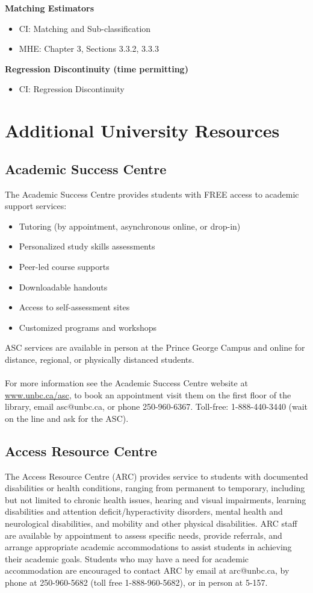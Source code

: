 \documentclass[letterpaper,12pt]{article}
\theoremstyle{dotlessS}
\begin{document}
\textbf{Matching Estimators}
\begin{itemize}
\item CI: Matching and Sub-classification
\item MHE: Chapter 3, Sections 3.3.2, 3.3.3
\end{itemize}
\textbf{Regression Discontinuity (time permitting)}
\begin{itemize}
\item CI: Regression Discontinuity
\end{itemize}


\section{Additional University Resources}


\subsection*{Academic Success Centre}

The Academic Success Centre provides students with FREE access to academic support services: 
\begin{itemize}
\item Tutoring (by appointment, asynchronous online, or drop-in)
\item Personalized study skills assessments 
\item Peer-led course supports 
\item Downloadable handouts 
\item Access to self-assessment sites 
\item Customized programs and workshops
\end{itemize}
ASC services are available in person at the Prince George Campus and online for distance, regional, or physically distanced students. \\
\\
For more information see the Academic Success Centre website at \url{www.unbc.ca/asc}, to book an appointment visit them on the first floor of the library, email asc@unbc.ca, or phone 250-960-6367. Toll-free: 1-888-440-3440 (wait on the line and ask for the ASC).



\subsection*{Access Resource Centre}
The Access Resource Centre (ARC) provides service to students with documented disabilities or health conditions, ranging from permanent to temporary, including but not limited to chronic health issues, hearing and visual impairments, learning disabilities and attention deficit/hyperactivity disorders, mental health and neurological disabilities, and mobility and other physical disabilities. ARC staff are available by appointment to assess specific needs, provide referrals, and arrange appropriate academic accommodations to assist students in achieving their academic goals. Students who may have a need for academic accommodation are encouraged to contact ARC by email at arc@unbc.ca, by phone at 250-960-5682 (toll free 1-888-960-5682), or in person at 5-157. 
\end{document}
